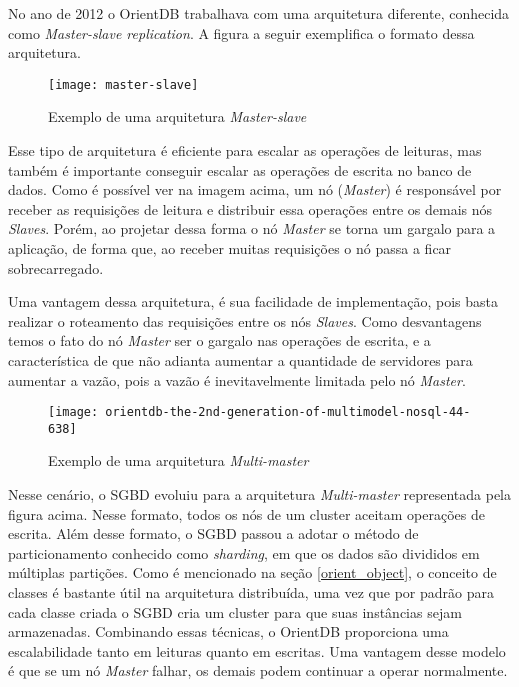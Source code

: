 	No ano de 2012 o OrientDB trabalhava com uma arquitetura diferente, conhecida como \textit{Master-slave replication}. A figura a seguir exemplifica o formato dessa arquitetura.
	
\begin{figure}[h]
	\centering
    \texttt{[image: master-slave]}
    \caption{Exemplo de uma arquitetura \textit{Master-slave}}
    \label{fig:master-slave}
\end{figure}

	Esse tipo de arquitetura é eficiente para escalar as operações de leituras, mas também é importante conseguir escalar as operações de escrita no banco de dados. Como é possível ver na imagem acima, um nó (\textit{Master}) é responsável por receber as requisições de leitura e distribuir essa operações entre os demais nós \textit{Slaves}. Porém, ao projetar dessa forma o nó \textit{Master} se torna um gargalo para a aplicação, de forma que, ao receber muitas requisições o nó passa a ficar sobrecarregado.
	
	Uma vantagem dessa arquitetura, é sua facilidade de implementação, pois basta realizar o roteamento das requisições entre os nós \textit{Slaves}. Como desvantagens temos o fato do nó \textit{Master} ser o gargalo nas operações de escrita, e a característica de que não adianta aumentar a quantidade de servidores para aumentar a vazão, pois a vazão é inevitavelmente limitada pelo nó \textit{Master}.
	
\begin{figure}[h]
	\centering
    \texttt{[image: orientdb-the-2nd-generation-of-multimodel-nosql-44-638]}
    \caption{Exemplo de uma arquitetura \textit{Multi-master}}
    \label{fig:multi-master}
\end{figure}
	
	Nesse cenário, o SGBD evoluiu para a arquitetura \textit{Multi-master} representada pela figura acima. Nesse formato, todos os nós de um cluster aceitam operações de escrita. Além desse formato, o SGBD passou a adotar o método de particionamento conhecido como \textit{sharding}, em que os dados são divididos em múltiplas partições. Como é mencionado na seção \ref{orient_object}, o conceito de classes é bastante útil na arquitetura distribuída, uma vez que por padrão para cada classe criada o SGBD cria um cluster para que suas instâncias sejam armazenadas. Combinando essas técnicas, o OrientDB proporciona uma escalabilidade tanto em leituras quanto em escritas. Uma vantagem desse modelo é que se um nó \textit{Master} falhar, os demais podem continuar a operar normalmente.

